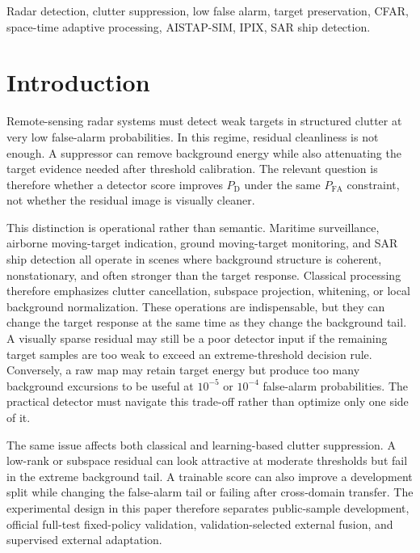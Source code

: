 \documentclass[journal]{IEEEtran}
\begin{document}
\begin{IEEEkeywords}
Radar detection, clutter suppression, low false alarm, target preservation, CFAR, space-time adaptive processing, AISTAP-SIM, IPIX, SAR ship detection.
\end{IEEEkeywords}

\section{Introduction}

Remote-sensing radar systems must detect weak targets in structured clutter at very low false-alarm probabilities. In this regime, residual cleanliness is not enough. A suppressor can remove background energy while also attenuating the target evidence needed after threshold calibration. The relevant question is therefore whether a detector score improves $P_{\mathrm{D}}$ under the same $P_{\mathrm{FA}}$ constraint, not whether the residual image is visually cleaner.

This distinction is operational rather than semantic. Maritime surveillance, airborne moving-target indication, ground moving-target monitoring, and SAR ship detection all operate in scenes where background structure is coherent, nonstationary, and often stronger than the target response. Classical processing therefore emphasizes clutter cancellation, subspace projection, whitening, or local background normalization. These operations are indispensable, but they can change the target response at the same time as they change the background tail. A visually sparse residual may still be a poor detector input if the remaining target samples are too weak to exceed an extreme-threshold decision rule. Conversely, a raw map may retain target energy but produce too many background excursions to be useful at $10^{-5}$ or $10^{-4}$ false-alarm probabilities. The practical detector must navigate this trade-off rather than optimize only one side of it.

The same issue affects both classical and learning-based clutter suppression. A low-rank or subspace residual can look attractive at moderate thresholds but fail in the extreme background tail. A trainable score can also improve a development split while changing the false-alarm tail or failing after cross-domain transfer. The experimental design in this paper therefore separates public-sample development, official full-test fixed-policy validation, validation-selected external fusion, and supervised external adaptation.
\end{document}
